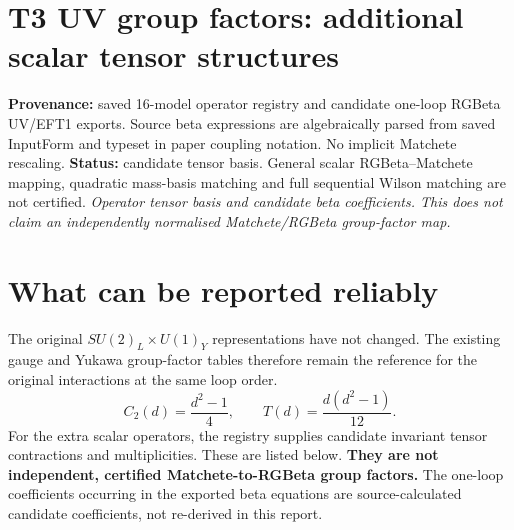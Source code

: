 \documentclass[9pt,a4paper]{article}
\begin{document}
\section*{T3 UV group factors: additional scalar tensor structures}
\textbf{Provenance:} saved 16-model operator registry and candidate one-loop RGBeta UV/EFT1 exports. Source beta expressions are algebraically parsed from saved InputForm and typeset in paper coupling notation. No implicit Matchete rescaling.
\textbf{Status:} candidate tensor basis. General scalar RGBeta--Matchete mapping, quadratic mass-basis matching and full sequential Wilson matching are not certified.
\textit{Operator tensor basis and candidate beta coefficients. This does not claim an independently normalised Matchete/RGBeta group-factor map.}
\bigskip
\section*{What can be reported reliably}
The original $SU(2)_L\times U(1)_Y$ representations have not changed. The existing gauge and Yukawa group-factor tables therefore remain the reference for the original interactions at the same loop order.
\[C_2(d)=\frac{d^2-1}{4},\qquad T(d)=\frac{d(d^2-1)}{12}.\]
For the extra scalar operators, the registry supplies candidate invariant tensor contractions and multiplicities. These are listed below. \textbf{They are not independent, certified Matchete-to-RGBeta group factors.} The one-loop coefficients occurring in the exported beta equations are source-calculated candidate coefficients, not re-derived in this report.
\end{document}
